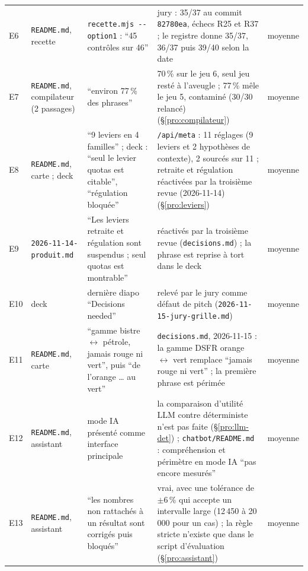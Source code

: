 \begin{small}
\begin{longtable}{@{}p{}p{}p{}p{}p{}@{}}
E6 & \texttt{README.md}, recette & \texttt{recette.mjs -\allowbreak{}-\allowbreak{}option1} : \enquote{45 contrôles sur 46} & jury : 35/37\mesure{} au commit \texttt{82780ea}, échecs R25 et R37 ; le registre donne 35/37, 36/37 puis 39/40\mesure{} selon la date & moyenne \\
E7 & \texttt{README.md}, compilateur (2 passages) & \enquote{environ 77\,\% des phrases} & 70\mesure{}\,\% sur le jeu 6, seul jeu resté à l'aveugle ; 77\,\% mêle le jeu 5, contaminé (30/30\mesure{} relancé) (§\ref{pro:compilateur}) & moyenne \\
E8 & \texttt{README.md}, carte ; deck & \enquote{9 leviers en 4 familles} ; deck : \enquote{seul le levier quotas est citable}, \enquote{régulation bloquée} & \texttt{/\allowbreak{}api/\allowbreak{}meta} : 11\mesure{} réglages (9 leviers et 2 hypothèses de contexte), 2\mesure{} sourcés sur 11 ; retraite et régulation réactivées par la troisième revue (2026-11-14) (§\ref{pro:leviers}) & moyenne \\
E9 & \texttt{2026-\allowbreak{}11-\allowbreak{}14-\allowbreak{}produit.md} & \enquote{Les leviers retraite et régulation sont suspendus ; seul quotas est montrable} & réactivés par la troisième revue (\texttt{decisions.md}) ; la phrase est reprise à tort dans le deck & moyenne \\
E10 & deck & dernière diapo \enquote{Decisions needed} & relevé par le jury comme défaut de pitch (\texttt{2026-\allowbreak{}11-\allowbreak{}15-\allowbreak{}jury-\allowbreak{}grille.md}) & moyenne \\
E11 & \texttt{README.md}, carte & \enquote{gamme bistre $\leftrightarrow$ pétrole, jamais rouge ni vert}, puis \enquote{de l'orange \ldots{} au vert} & \texttt{decisions.md}, 2026-11-15 : la gamme DSFR orange $\leftrightarrow$ vert remplace \enquote{jamais rouge ni vert} ; la première phrase est périmée & moyenne \\
E12 & \texttt{README.md}, assistant & mode IA présenté comme interface principale & la comparaison d'utilité LLM contre déterministe n'est pas faite (§\ref{pro:llm-det}) ; \texttt{chatbot/\allowbreak{}README.md} : compréhension et périmètre en mode IA \enquote{pas encore mesurés} & moyenne \\
E13 & \texttt{README.md}, assistant & \enquote{les nombres non rattachés à un résultat sont corrigés puis bloqués} & vrai, avec une tolérance de $\pm6$\mesure{}\,\% qui accepte un intervalle large (12\,450 à 20\,000\derive{} pour un cas) ; la règle stricte n'existe que dans le script d'évaluation (§\ref{pro:assistant}) & moyenne \\

\end{longtable}
\end{small}
